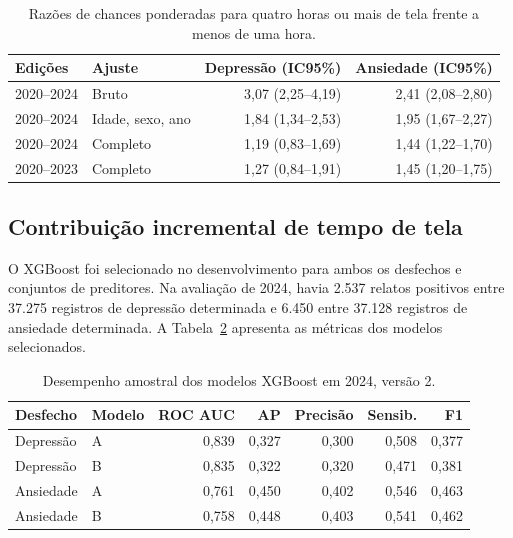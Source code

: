 ﻿\documentclass[12pt]{article}
\begin{document}
\begin{table}[htbp]
\centering
\caption{Razões de chances ponderadas para quatro horas ou mais de tela frente a menos de uma hora.}
\label{tab:ajustes}
\begin{tabular}{llrr}\hline
Edições & Ajuste & Depressão (IC95\%) & Ansiedade (IC95\%) \\\hline
2020--2024 & Bruto & 3,07 (2,25--4,19) & 2,41 (2,08--2,80) \\
2020--2024 & Idade, sexo, ano & 1,84 (1,34--2,53) & 1,95 (1,67--2,27) \\
2020--2024 & Completo & 1,19 (0,83--1,69) & 1,44 (1,22--1,70) \\
2020--2023 & Completo & 1,27 (0,84--1,91) & 1,45 (1,20--1,75) \\\hline
\end{tabular}

\end{table}

\subsection{Contribuição incremental de tempo de tela}
O XGBoost foi selecionado no desenvolvimento para ambos os desfechos e conjuntos de preditores. Na avaliação de 2024, havia 2.537 relatos positivos entre 37.275 registros de depressão determinada e 6.450 entre 37.128 registros de ansiedade determinada. A Tabela~\ref{tab:predicao} apresenta as métricas dos modelos selecionados.

\begin{table}[htbp]
\centering
\caption{Desempenho amostral dos modelos XGBoost em 2024, versão 2.}
\label{tab:predicao}
\begin{tabular}{llrrrrr}\hline
Desfecho & Modelo & ROC AUC & AP & Precisão & Sensib. & F1 \\\hline
Depressão & A & 0,839 & 0,327 & 0,300 & 0,508 & 0,377 \\
Depressão & B & 0,835 & 0,322 & 0,320 & 0,471 & 0,381 \\
Ansiedade & A & 0,761 & 0,450 & 0,402 & 0,546 & 0,463 \\
Ansiedade & B & 0,758 & 0,448 & 0,403 & 0,541 & 0,462 \\\hline
\end{tabular}

\end{table}
\end{document}

